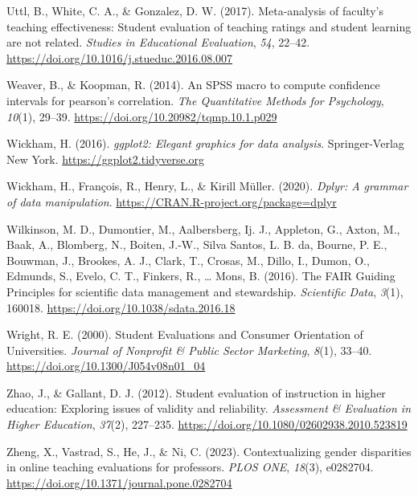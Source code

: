 \documentclass[
  man]{apa7}
\newlength{\cslhangindent}
\newenvironment{CSLReferences}[2] %
 {\begin{list}{}{%
  \setlength{\itemindent}{0pt}
  \setlength{\leftmargin}{0pt}
  \setlength{\parsep}{0pt}
  \ifodd #1
   \setlength{\leftmargin}{\cslhangindent}
   \setlength{\itemindent}{-1\cslhangindent}
  \fi
  \setlength{\itemsep}{#2\baselineskip}}}
 {\end{list}}
\begin{document}
\begin{CSLReferences}{1}{0}
Uttl, B., White, C. A., \& Gonzalez, D. W. (2017). Meta-analysis of faculty's teaching effectiveness: Student evaluation of teaching ratings and student learning are not related. \emph{Studies in Educational Evaluation}, \emph{54}, 22--42. \url{https://doi.org/10.1016/j.stueduc.2016.08.007}

Weaver, B., \& Koopman, R. (2014). An SPSS macro to compute confidence intervals for pearson{'}s correlation. \emph{The Quantitative Methods for Psychology}, \emph{10}(1), 29--39. \url{https://doi.org/10.20982/tqmp.10.1.p029}

Wickham, H. (2016). \emph{ggplot2: Elegant graphics for data analysis}. Springer-Verlag New York. \url{https://ggplot2.tidyverse.org}

Wickham, H., François, R., Henry, L., \& Kirill Müller. (2020). \emph{Dplyr: A grammar of data manipulation}. \url{https://CRAN.R-project.org/package=dplyr}

Wilkinson, M. D., Dumontier, M., Aalbersberg, Ij. J., Appleton, G., Axton, M., Baak, A., Blomberg, N., Boiten, J.-W., Silva Santos, L. B. da, Bourne, P. E., Bouwman, J., Brookes, A. J., Clark, T., Crosas, M., Dillo, I., Dumon, O., Edmunds, S., Evelo, C. T., Finkers, R., \ldots{} Mons, B. (2016). The FAIR Guiding Principles for scientific data management and stewardship. \emph{Scientific Data}, \emph{3}(1), 160018. \url{https://doi.org/10.1038/sdata.2016.18}

Wright, R. E. (2000). Student Evaluations and Consumer Orientation of Universities. \emph{Journal of Nonprofit \& Public Sector Marketing}, \emph{8}(1), 33--40. \url{https://doi.org/10.1300/J054v08n01_04}

Zhao, J., \& Gallant, D. J. (2012). Student evaluation of instruction in higher education: Exploring issues of validity and reliability. \emph{Assessment \& Evaluation in Higher Education}, \emph{37}(2), 227--235. \url{https://doi.org/10.1080/02602938.2010.523819}

Zheng, X., Vastrad, S., He, J., \& Ni, C. (2023). Contextualizing gender disparities in online teaching evaluations for professors. \emph{PLOS ONE}, \emph{18}(3), e0282704. \url{https://doi.org/10.1371/journal.pone.0282704}

\end{CSLReferences}
\end{document}
